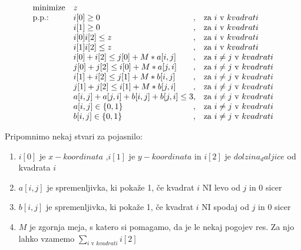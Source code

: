 \documentclass[a4paper, 11pt]{article}
\begin{document}
 \begin{equation*}
    \begin{array}{ll@{}ll}
    \text{minimize}  & z &\\
    \text{p.p.:}& i[0] \geq 0 & ,  & \text{za $i$ v $kvadrati$}\\
                & i[1] \geq 0 & ,  & \text{za $i$ v $kvadrati$}\\
                & i[0] i[2] \leq z & ,  & \text{za $i$ v $kvadrati$}\\
                & i[1] i[2] \leq z & ,  & \text{za $i$ v $kvadrati$}\\
                & i[0] + i[2] \leq j[0] + M * a[i,j]& , &\text{za $i \neq j $ v $kvadrati$} \\
                & j[0] + j[2] \leq i[0] + M * a[j,i]& , &\text{za $i \neq j $ v $kvadrati$} \\
                & i[1] + i[2] \leq j[1] + M * b[i,j]& , &\text{za $i \neq j $ v $kvadrati$} \\
                & j[1] + j[2] \leq i[1] + M * b[j,i]& , &\text{za $i \neq j $ v $kvadrati$} \\
                & a[i, j] + a[j, i] + b[i, j] + b[j, i] \leq 3& , &\text{za $i \neq j $ v $kvadrati$} \\
                & a[i,j] \in \{0,1\} & , &\text{za $i \neq j $ v $kvadrati$} \\
                & b[i,j] \in \{0,1\} & , &\text{za $i \neq j $ v $kvadrati$} \\
    \end{array}
    \end{equation*}

Pripomnimo nekaj stvari za pojasnilo:
\begin{enumerate}\label{opombice}
    \item  $i[0]$ je $x-koordinata$ ,$i[1]$ je $y-koordinata$ in $i[2]$ je $dolzina_daljice$ od kvadrata $i$
    \item $a[i,j]$ je spremenljivka, ki pokaže 1, če kvadrat $i$ NI levo od $j$ in 0 sicer
    \item $b[i,j]$ je spremenljivka, ki pokaže 1, če kvadrat $i$ NI spodaj od $j$ in 0 sicer
    \item $M$ je zgornja meja, s katero si pomagamo, da je le nekaj pogojev res. Za njo lahko vzamemo $\displaystyle\sum\limits_{\text{$i$ v }kvadrati}i[2]$
\end{enumerate}
\end{document}
